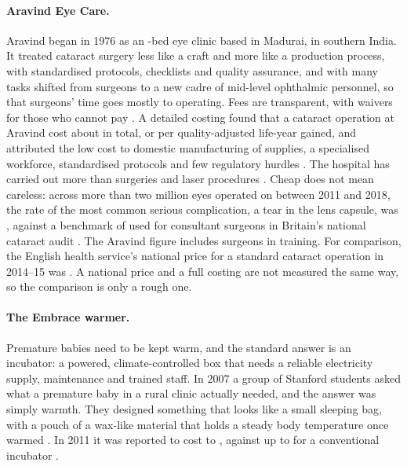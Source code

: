 \paragraph{Aravind Eye Care.} Aravind began in 1976 as an
\aravindStartBeds{}-bed eye clinic based in Madurai, in southern India. It
treated cataract surgery less like a craft and more like a production process,
with standardised protocols, checklists and quality assurance, and with many
tasks shifted from surgeons to a new cadre of mid-level ophthalmic personnel,
so that surgeons' time goes mostly to operating. Fees are transparent, with
waivers for those who cannot pay \parencite{ravilla2014}. A detailed costing found that a cataract operation at Aravind cost
about \aravindCostPerOp{} in total, or \aravindCostPerQaly{} per
quality-adjusted life-year gained, and attributed the low cost to domestic
manufacturing of supplies, a specialised workforce, standardised protocols and
few regulatory hurdles \parencite{le2016aravind}. The hospital has carried out
more than \aravindSurgeries{} surgeries and laser procedures
\parencite{ravilla2014}. Cheap does not mean careless: across more than two
million eyes operated on between 2011 and 2018, the rate of the most common
serious complication, a tear in the lens capsule, was \aravindPcrRate{}
\parencite{haripriya2019}, against a benchmark of \ukPcrBenchmark{} used for
consultant surgeons in Britain's national cataract audit \parencite{buchan2020nod}.
The Aravind figure includes surgeons in training. For comparison, the English health service's national price for a
standard cataract operation in 2014--15 was \nhsCataractTariff{}
\parencite{monitor2014tariff}. A national price and a full costing are not
measured the same way, so the comparison is only a rough one.

\paragraph{The Embrace warmer.} Premature babies need to be kept warm, and the
standard answer is an incubator: a powered, climate-controlled box that needs a
reliable electricity supply, maintenance and trained staff. In 2007 a group of
Stanford students asked what a premature baby in a rural clinic actually
needed, and the answer was simply warmth. They designed something that looks
like a small sleeping bag, with a pouch of a wax-like material that holds a
steady body temperature once warmed \parencite{routson2011embrace}. In 2011 it was reported to cost \embraceCostLow{} to
\embraceCostHigh{}, against up to \incubatorCost{} for a conventional
incubator \parencite{routson2011embrace}.

